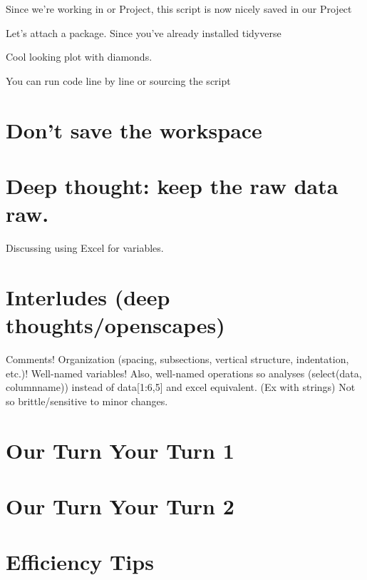 \documentclass[]{book}
\begin{document}
Since we're working in or Project, this script is now nicely saved in our Project

Let's attach a package. Since you've already installed tidyverse

Cool looking plot with diamonds.

You can run code line by line or sourcing the script

\hypertarget{dont-save-the-workspace}{%
\section{Don't save the workspace}\label{dont-save-the-workspace}}

\hypertarget{deep-thought-keep-the-raw-data-raw.}{%
\section{Deep thought: keep the raw data raw.}\label{deep-thought-keep-the-raw-data-raw.}}

Discussing using Excel for variables.

\hypertarget{interludes-deep-thoughtsopenscapes}{%
\section{Interludes (deep thoughts/openscapes)}\label{interludes-deep-thoughtsopenscapes}}

Comments! Organization (spacing, subsections, vertical structure, indentation, etc.)! Well-named variables! Also, well-named operations so analyses (select(data, columnname)) instead of data{[}1:6,5{]} and excel equivalent. (Ex with strings)
Not so brittle/sensitive to minor changes.

\hypertarget{our-turn-your-turn-1}{%
\section{Our Turn Your Turn 1}\label{our-turn-your-turn-1}}

\hypertarget{our-turn-your-turn-2}{%
\section{Our Turn Your Turn 2}\label{our-turn-your-turn-2}}

\hypertarget{efficiency-tips}{%
\section{Efficiency Tips}\label{efficiency-tips}}
\end{document}
